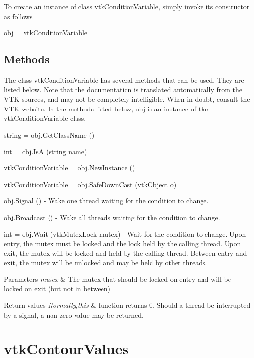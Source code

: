 To create an instance of class vtk\-Condition\-Variable, simply invoke its constructor as follows \begin{DoxyVerb}  obj = vtkConditionVariable
\end{DoxyVerb}
 \hypertarget{vtkwidgets_vtkxyplotwidget_Methods}{}\subsection{Methods}\label{vtkwidgets_vtkxyplotwidget_Methods}
The class vtk\-Condition\-Variable has several methods that can be used. They are listed below. Note that the documentation is translated automatically from the V\-T\-K sources, and may not be completely intelligible. When in doubt, consult the V\-T\-K website. In the methods listed below, {\ttfamily obj} is an instance of the vtk\-Condition\-Variable class. 
\begin{DoxyItemize}
\item {\ttfamily string = obj.\-Get\-Class\-Name ()}  
\item {\ttfamily int = obj.\-Is\-A (string name)}  
\item {\ttfamily vtk\-Condition\-Variable = obj.\-New\-Instance ()}  
\item {\ttfamily vtk\-Condition\-Variable = obj.\-Safe\-Down\-Cast (vtk\-Object o)}  
\item {\ttfamily obj.\-Signal ()} -\/ Wake one thread waiting for the condition to change.  
\item {\ttfamily obj.\-Broadcast ()} -\/ Wake all threads waiting for the condition to change.  
\item {\ttfamily int = obj.\-Wait (vtk\-Mutex\-Lock mutex)} -\/ Wait for the condition to change. Upon entry, the mutex must be locked and the lock held by the calling thread. Upon exit, the mutex will be locked and held by the calling thread. Between entry and exit, the mutex will be unlocked and may be held by other threads.


\begin{DoxyParams}{Parameters}
{\em mutex} & The mutex that should be locked on entry and will be locked on exit (but not in between) \\
\hline
\end{DoxyParams}

\begin{DoxyRetVals}{Return values}
{\em Normally,this} & function returns 0. Should a thread be interrupted by a signal, a non-\/zero value may be returned.  \\
\hline
\end{DoxyRetVals}

\end{DoxyItemize}\hypertarget{vtkcommon_vtkcontourvalues}{}\section{vtk\-Contour\-Values}\label{vtkcommon_vtkcontourvalues}
